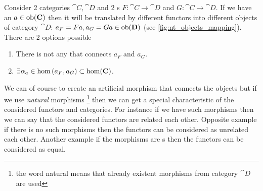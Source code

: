 Consider 2 categories $\cat{C}, \cat{D}$ and 2
s $F: \cat{C} \to \cat{D}$ and $G: \cat{C} \to
\cat{D}$. If we have an  $a \in \mathrm{ob}(\mathbf{C})$ then
it will be translated by different functors into different objects of
category $\cat{D}$: $a_F = F a, a_G = G a \in \mathrm{ob}(\mathbf{D})$ (see
\cref{fig:nt_objects_mapping}). There are 2 options possible
\begin{enumerate}
\item There is not  any  that connects $a_F$
  and $a_G$.
\item $\exists \alpha_a \in \hom\left(a_F, a_G\right) \subset
  \mathrm{hom}(\mathbf{C})$. 
\end{enumerate}
We can of course to create an artificial morphism that connects the
objects but if we use \textit{natural} morphisms 
\footnote{the word natural means that already existent morphisms from
  category $\cat{D}$ are used}
then we can get a
special characteristic of the considered functors and categories. For
instance if we have such morphisms then we can say that the
considered functors are related each other. Opposite example if there
is no such morphisms then the functors can be considered as unrelated
each other. Another example if the
morphisms are s then the functors can be
considered as equal.

